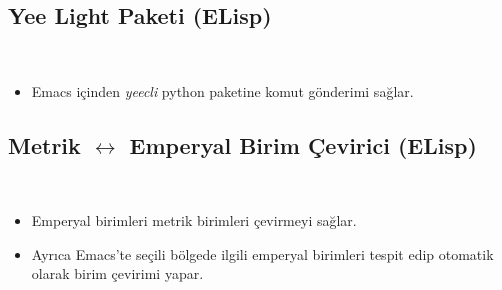 \documentclass[a4paper, 9pt]{extarticle}
\begin{document}
\subsection{Yee Light Paketi (ELisp)} \hfill \\
\begin{itemize}
    \item Emacs içinden \emph{yeecli} python paketine komut gönderimi sağlar.
\end{itemize}

\subsection{Metrik $\longleftrightarrow$ Emperyal Birim Çevirici (ELisp)} \hfill \\
\begin{itemize}
    \item Emperyal birimleri metrik birimleri çevirmeyi sağlar.
    \item Ayrıca Emacs'te seçili bölgede ilgili emperyal birimleri tespit edip otomatik olarak birim çevirimi yapar.
\end{itemize}

\mydiller{}
\myteknikbecerilerb{}
\myhobilerb{}

\end{document}
